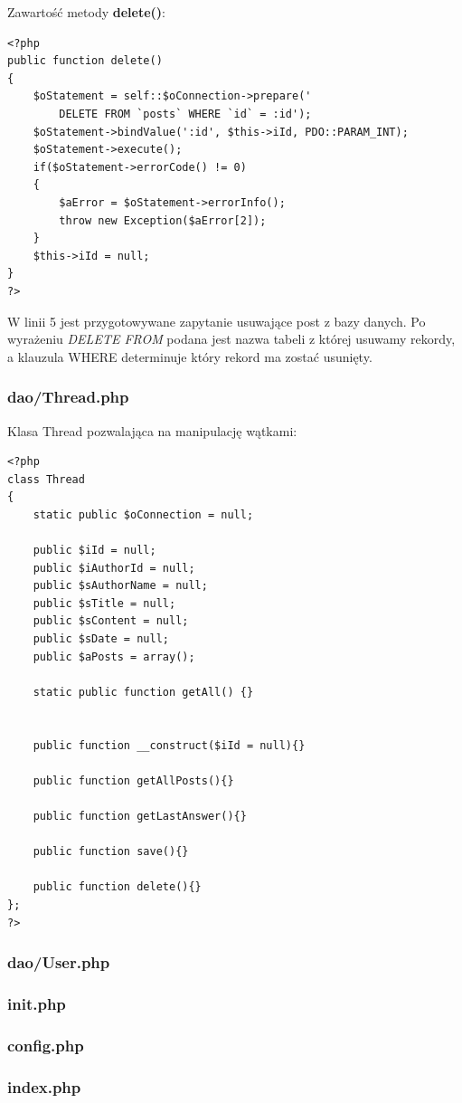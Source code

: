 \documentclass[a4paper,10pt]{article}
\begin{document}
Zawartość metody \textbf{delete()}: \\
\begin{verbatim}
<?php
public function delete()
{
	$oStatement = self::$oConnection->prepare('
		DELETE FROM `posts` WHERE `id` = :id');
	$oStatement->bindValue(':id', $this->iId, PDO::PARAM_INT);
	$oStatement->execute();
	if($oStatement->errorCode() != 0)
	{
		$aError = $oStatement->errorInfo();
		throw new Exception($aError[2]);
	}
	$this->iId = null;
}
?>
\end{verbatim}
W linii 5 jest przygotowywane zapytanie usuwające post z bazy danych. Po wyrażeniu \textit{DELETE FROM} podana jest nazwa tabeli z której usuwamy rekordy, a klauzula WHERE determinuje który rekord ma zostać usunięty.

\subsubsection{dao/Thread.php}
Klasa Thread pozwalająca na manipulację wątkami: \\
\begin{verbatim}
<?php
class Thread
{
	static public $oConnection = null;

	public $iId = null;
	public $iAuthorId = null;
	public $sAuthorName = null;
	public $sTitle = null;
	public $sContent = null;
	public $sDate = null;
	public $aPosts = array();

	static public function getAll() {}


	public function __construct($iId = null){}

	public function getAllPosts(){}

	public function getLastAnswer(){}

	public function save(){}

	public function delete(){}
};
?>
\end{verbatim}

\subsubsection{dao/User.php}
\subsubsection{init.php}
\subsubsection{config.php}
\subsubsection{index.php}
\end{document}
